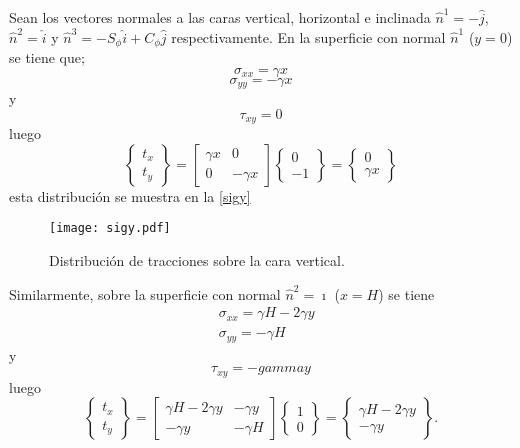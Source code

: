 \documentclass[../notas medios.tex]{subfiles}
\begin{document}
Sean los vectores normales a las caras vertical, horizontal e inclinada ${{\hat n}^1} =  - \hat j$, ${{\hat n}^2} =   \hat i$ y ${{\hat n}^3} =  - {S_\phi }\hat i + {C_\phi }\hat j$ respectivamente. En la superficie con normal ${{\hat n}^1}$ ($y=0$) se tiene que;
\[{\sigma _{xx}} = \gamma x\]
\[{\sigma _{yy}} =  - \gamma x\]
y
\[{\tau _{xy}} = 0 \]
luego
\[\left\{ {\begin{array}{*{20}{c}}
{{t_x}}\\
{{t_y}}
\end{array}} \right\} = \left[ {\begin{array}{*{20}{c}}
{\gamma x}&0\\
0&{ - \gamma x}
\end{array}} \right]\left\{ {\begin{array}{*{20}{c}}
0\\
{ - 1}
\end{array}} \right\} = \left\{ {\begin{array}{*{20}{c}}
0\\
{\gamma x}
\end{array}} \right\}\]
esta distribución se muestra en la \cref{sigy}

\begin{figure}[H]
\centering
	\texttt{[image: sigy.pdf]}
	\caption{Distribución de tracciones sobre la cara vertical.}
	\label{sigx}
\end{figure}


Similarmente, sobre la superficie con normal $\hat{n}^2 =   \hat\imath$ ($x=H$) se tiene
\begin{align*}
&\sigma_{xx} = \gamma H - 2\gamma y\\
&\sigma_{yy} =  -\gamma H
\end{align*}
y
\[\tau_{xy} =  - gamma y\]
luego
\[\left\{ {\begin{array}{*{20}{c}}
{{t_x}}\\
{{t_y}}
\end{array}} \right\} = \left[ {\begin{array}{*{20}{c}}
{\gamma H - 2\gamma y}&{ - \gamma y}\\
{ - \gamma y}&{ - \gamma H}
\end{array}} \right]\left\{ {\begin{array}{*{20}{c}}
1\\
0
\end{array}} \right\} = \left\{ {\begin{array}{*{20}{c}}
{\gamma H - 2\gamma y}\\
{ - \gamma y}
\end{array}} \right\}.\]
\end{document}
